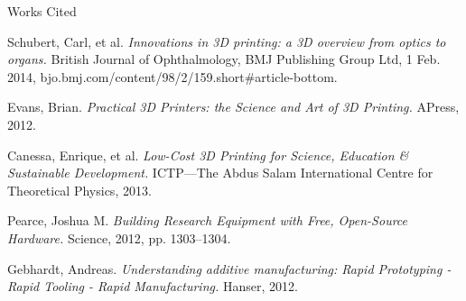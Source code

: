\documentclass[12pt]{article}
\newcommand{\bibent}{\noindent \hangindent 40pt}
\newenvironment{workscited}{\newpage \begin{center} Works Cited \end{center}}{\newpage }
\begin{document}
\begin{flushleft}
\begin{workscited}

\bibent
Schubert, Carl, et al. \textit{Innovations in 3D printing: a 3D overview from optics to organs.} British Journal of Ophthalmology, BMJ Publishing Group Ltd, 1 Feb. 2014, bjo.bmj.com/content/98/2/159.short\#article-bottom.

\bibent
Evans, Brian. \textit{Practical 3D Printers: the Science and Art of 3D Printing.} APress, 2012.

\bibent
Canessa, Enrique, et al. \textit{Low-Cost 3D Printing for Science, Education \& Sustainable Development.} ICTP—The Abdus Salam International Centre for Theoretical Physics, 2013.

\bibent
Pearce, Joshua M. \textit{Building Research Equipment with Free, Open-Source Hardware.} Science, 2012, pp. 1303–1304.

\bibent
Gebhardt, Andreas. \textit{Understanding additive manufacturing: Rapid Prototyping - Rapid Tooling - Rapid Manufacturing.} Hanser, 2012.


\end{workscited}

\end{flushleft}
\end{document}
